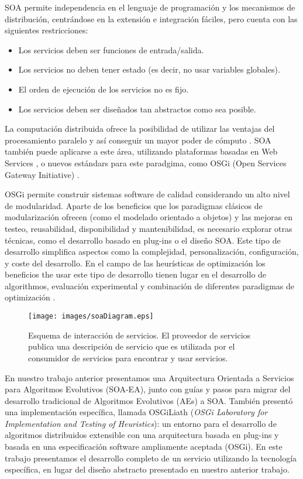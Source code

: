 \documentclass[runningheads]{llncs}
\begin{document}
SOA permite independencia en el lenguaje de programación y los mecanismos de distribución, centrándose en la extensión e integración fáciles, pero cuenta con las siguientes restricciones:

\begin{itemize}
\item Los servicios deben ser funciones de entrada/salida.
\item Los servicios no deben tener estado (es decir, no usar variables globales).
\item El orden de ejecución de los servicios no es fijo.
\item Los servicios deben ser diseñados tan abstractos como sea posible.
\end{itemize}

La computación distribuida ofrece la posibilidad de utilizar las ventajas del procesamiento paralelo y así conseguir un mayor poder de cómputo \cite{OPENSCIENCEGRID}.
SOA también puede aplicarse a este área, utilizando plataformas basadas en Web Services \cite{PAPAZOGLOU}, o nuevos estándars para este paradgima, como OSGi (Open Services Gateway Initiative) \cite{OSGI}.

OSGi permite construir sistemas software de calidad considerando un alto nivel de modularidad. Aparte de los beneficios que los paradigmas clásicos de modularización ofrecen (como el modelado orientado a objetos) y las mejoras en testeo, reusabilidad, disponibilidad y mantenibilidad, es necesario explorar otras técnicas, como el desarrollo basado en plug-ins o el diseño SOA. Este tipo de desarrollo simplifica aspectos como la complejidad, personalización, configuración, y coste del desarrollo. En el campo de las heurísticas de optimización los beneficios the usar este tipo de desarrollo tienen lugar en el desarrollo de algorithmos, evaluación experimental y combinación de diferentes paradigmas de optimización \cite{PLUGINS}.

 \begin{figure}[ht] 
\begin{center} 
\texttt{[image: images/soaDiagram.eps]}
\end{center} 
\caption{Esquema de interacción de servicios. El proveedor de servicios publica una descripción de servicio que es utilizada por el consumidor de servicios para encontrar y usar servicios.} 
\label{SOADIAGRAM} 
\end{figure} 

En nuestro trabajo anterior \cite{OSGILIATH} presentamos una Arquitectura Orientada a Servicios para Algoritmos Evolutivos (SOA-EA), junto con guías y pasos para migrar del desarrollo tradicional de Algoritmos Evolutivos (AEs) a SOA. También presentó una implementación específica, llamada OSGiLiath ({\em OSGi Laboratory for Implementation and Testing of Heuristics}): un entorno para el desarrollo de algoritmos distribuidos extensible con una arquitectura basada en plug-ins y basada en una especificación software ampliamente aceptada (OSGi). En este trabajo presentamos el desarrollo completo de un servicio utilizando la tecnología específica, en lugar del diseño abstracto presentado en nuestro anterior trabajo.
\end{document}
